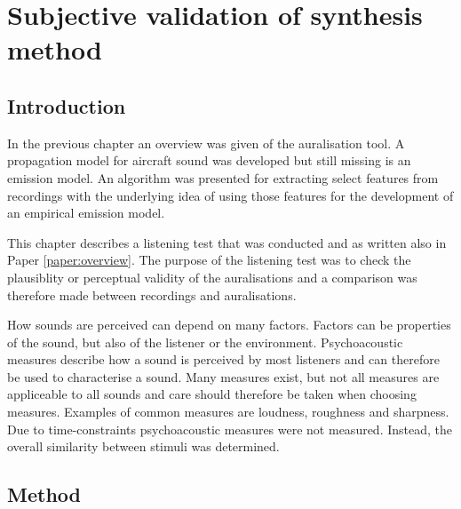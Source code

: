 \chapter{Subjective validation of synthesis method}\label{chapter:test}

\section{Introduction}
In the previous chapter an overview was given of the auralisation tool. A
propagation model for aircraft sound was developed but still missing is an
emission model. An algorithm was presented for extracting select features from
recordings with the underlying idea of using those features for the development
of an empirical emission model.

This chapter describes a listening test that was conducted and as written also in
Paper \ref{paper:overview}. The purpose of the listening test was to check the
plausiblity or perceptual validity of the auralisations and a comparison was
therefore made between recordings and auralisations.

How sounds are perceived can depend on many factors. Factors can be properties
of the sound, but also of the listener or the environment. Psychoacoustic
measures describe how a sound is perceived by most listeners and can therefore
be used to characterise a sound. Many measures exist, but not all measures are
appliceable to all sounds and care should therefore be taken when choosing
measures. Examples of common measures are loudness, roughness and sharpness.
Due to time-constraints psychoacoustic measures were not measured. Instead, the
overall similarity between stimuli was determined.

%


\section{Method} %

